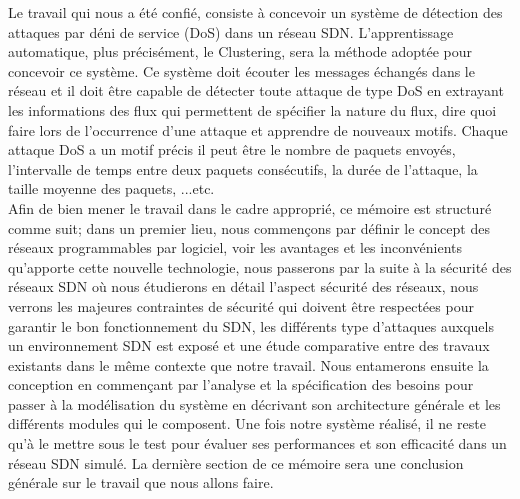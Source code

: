 	Le travail qui nous a été confié, consiste à concevoir un système de détection des attaques par déni de service (DoS) dans un réseau SDN. L’apprentissage automatique, plus précisément, le Clustering, sera la méthode adoptée pour concevoir ce système. Ce système doit écouter les messages échangés dans le réseau et il doit être capable de détecter toute attaque de type DoS en extrayant les informations des flux qui permettent  de spécifier la nature du flux, dire quoi faire lors de l’occurrence d’une attaque et apprendre de nouveaux motifs. Chaque attaque DoS a un motif précis il peut être  le nombre de paquets envoyés, l’intervalle de temps entre deux paquets consécutifs, la durée de l’attaque, la taille moyenne des paquets, ...etc.\\
\newpage
Afin de bien mener le travail dans le cadre approprié, ce mémoire est structuré comme suit; dans un premier lieu, nous commençons par définir le concept des réseaux programmables par logiciel, voir les avantages et les inconvénients qu'apporte cette nouvelle technologie, nous passerons par la suite à la sécurité des réseaux SDN où nous étudierons en détail l'aspect sécurité des réseaux, nous verrons les majeures contraintes de sécurité qui doivent être respectées pour garantir le bon fonctionnement du SDN, les différents type d’attaques auxquels un environnement SDN est exposé et une étude comparative entre des travaux existants dans le même contexte que notre travail. Nous entamerons ensuite la conception en commençant par l'analyse et la spécification des besoins pour passer à la modélisation du système en décrivant son architecture générale et les différents modules qui le composent. Une fois notre système réalisé, il ne reste qu'à le mettre sous le test pour évaluer ses performances et son efficacité dans un réseau SDN simulé. La dernière section de ce mémoire sera une conclusion générale sur le travail que nous allons faire.\\
